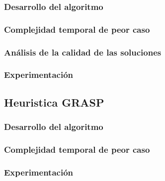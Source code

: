 \documentclass[a4paper, 10pt, twoside]{article}
\begin{document}
      \subsubsection{Desarrollo del algoritmo}
      \label{subsub:algoritmos-heuristicos-busqueda-desarrollo_algoritmo.tex}
      
      
      \subsubsection{Complejidad temporal de peor caso}
      \label{subsub:algoritmos-heuristicos-busqueda-complejidad.tex}
      

      \subsubsection{Análisis de la calidad de las soluciones}
      \label{subsub:algoritmos-heuristicos-busqueda-calidad.tex}
      

      \subsubsection{Experimentación}
      \label{subsub:algoritmos-heuristicos-busqueda-experimentacion.tex}
      
  \newpage

  \subsection{Heuristica GRASP}
  \label{sub:algoritmos-heuristicos-grasp}
      \subsubsection{Desarrollo del algoritmo}
      \label{subsub:algoritmos-heuristicos-grasp-desarrollo.tex}
      

      \subsubsection{Complejidad temporal de peor caso}
      \label{subsub:algoritmos-heuristicos-grasp-complejidad.tex}
      

      \subsubsection{Experimentación}
      \label{subsub:algoritmos-heuristicos-grasp-experimentacion.tex}
      
\end{document}
